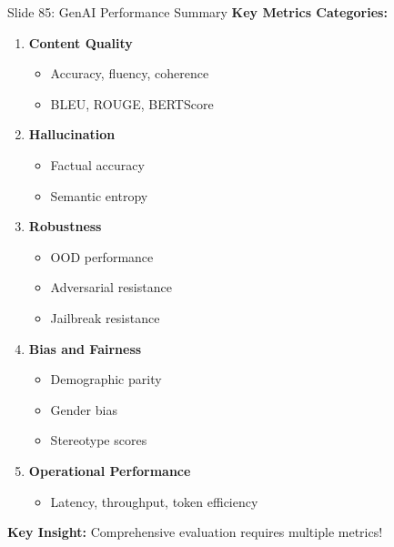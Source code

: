 \documentclass[8pt]{beamer}
\begin{document}
	\begin{frame}{Slide 85: GenAI Performance Summary}
		\fontsize{6.5}{7.5}\selectfont
		\textbf{Key Metrics Categories:}
		\begin{enumerate}
			\item \textbf{Content Quality}
			\begin{itemize}
				\item Accuracy, fluency, coherence
				\item BLEU, ROUGE, BERTScore
			\end{itemize}
			\item \textbf{Hallucination}
			\begin{itemize}
				\item Factual accuracy
				\item Semantic entropy
			\end{itemize}
			\item \textbf{Robustness}
			\begin{itemize}
				\item OOD performance
				\item Adversarial resistance
				\item Jailbreak resistance
			\end{itemize}
			\item \textbf{Bias and Fairness}
			\begin{itemize}
				\item Demographic parity
				\item Gender bias
				\item Stereotype scores
			\end{itemize}
			\item \textbf{Operational Performance}
			\begin{itemize}
				\item Latency, throughput, token efficiency
			\end{itemize}
		\end{enumerate}
		
		\textcolor{myblue}{\textbf{Key Insight:}} Comprehensive evaluation requires multiple metrics!
	\end{frame}
	
	
\end{document}
